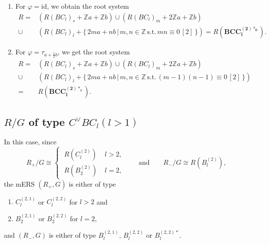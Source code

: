 \documentclass[11pt]{amsart}
\newcommand{\Z}{\mathbb{Z}}
\newcommand{\id}{\mathrm{id}}
\begin{document}
\begin{enumerate}
\begin{enumerate}
\item[(i)] For $\varphi=\id$, we obtain the root system
\begin{align*}
R=
&(R(BC_l)_s+\Z a+\Z b) \cup (R(BC_l)_m+2\Z a+\Z b) \\
\cup
&(R(BC_l)_l+ \{\, 2ma+nb\, \vert\, m,n \in \Z\, \text{s.t.}\, mn \equiv 0\, [2]\, \})
=
R(\mathbf{BCC_l^{(2)\ast_0}}).
\end{align*}
\item[(ii)] For $\varphi=\tau_{a+\frac{1}{2}b}$, we get the root system
\begin{align*}
R=
&(R(BC_l)_s+\Z a+\Z b) \cup (R(BC_l)_m+2\Z a+\Z b) \\
\cup
&(R(BC_l)_l+ \{\, 2ma+nb\, \vert\, m,n \in \Z\, \text{s.t.}\, (m-1)(n-1) \equiv 0\, [2]\, \}) \\
=
&R(\mathbf{BCC_l^{(2)\ast_1}}).
\end{align*}
\end{enumerate}
\end{enumerate}


\subsection{$R/G$ of type $C^\vee BC_l (l> 1)$}  
In this case, since 
\[ R_+/G \cong \begin{cases} \; R(C_l^{(2)}) \; &l>2, \\ \; R(B_2^{(2)})\; &l=2, \end{cases} \qquad 
\text{and} \qquad
  R_-/G \cong R(B_l^{(2)}), 
\]
the mERS $(R_+,G)$ is either of type
\begin{enumerate}
\item $C_l^{(2,1)}$ or $C_l^{(2,2)}$ for $l>2$ and
\item $B_2^{(2,1)}$ or $B_2^{(2,2)}$ for $l=2$,
\end{enumerate}
and $(R_-,G)$ is either of type $B_l^{(2,1)}, \, B_l^{(2,2)}$ or $B_l^{(2,2)\ast}$. 
\vskip 0.1in


 \quad \\
\end{document}
